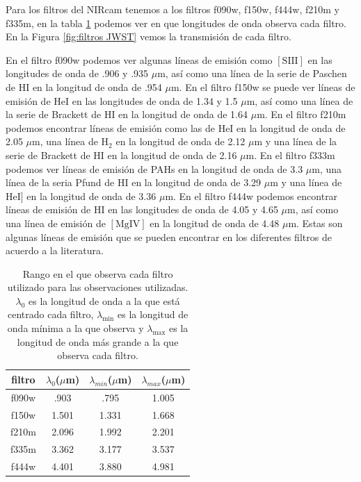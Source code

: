 \documentclass{book}
\begin{document}
Para los filtros del NIRcam  tenemos a los filtros f090w, f150w, f444w, f210m y f335m, en la tabla \ref{tab:filtros} podemos ver en que longitudes de onda observa cada filtro. En la Figura \ref{fig:filtros JWST} vemos la transmisión de cada filtro. 

En el filtro f090w podemos ver algunas líneas de emisión como $[\mathrm{S \scriptstyle{III}}]$ en las longitudes de onda de .906 y .935 $\mu$m, así como una línea de la serie de Paschen de $\mathrm{H\scriptstyle{I}}$ en la longitud de onda de .954 $\mu$m. En el filtro f150w se puede ver líneas de emisión de $\mathrm{He\scriptstyle{I}}$ en las longitudes de onda de 1.34 y 1.5 $\mu$m, así como una línea de la serie de Brackett de $\mathrm{H\scriptstyle{I}}$ en la longitud de onda de 1.64 $\mu$m. En el filtro f210m podemos encontrar líneas de emisión como las de $\mathrm{He\scriptstyle{I}}$ en la longitud de onda de 2.05 $\mu$m, una línea de $\mathrm{H_2}$ en la longitud de onda de  2.12 $\mu$m y una línea de la serie de Brackett de $\mathrm{H\scriptstyle{I}}$ en la longitud de onda de 2.16 $\mu$m. En el filtro f333m podemos ver líneas de emisión de PAHs en la longitud de onda de 3.3 $\mu$m, una línea de la seria Pfund de $\mathrm{H\scriptstyle{I}}$ en la longitud de onda de 3.29 $\mu$m y una línea de $\mathrm{He\scriptstyle{I}}]$ en la longitud de onda de 3.36 $\mu$m. En el filtro f444w podemos encontrar líneas de emisión de $\mathrm{H\scriptstyle{I}}$ en las longitudes de onda de 4.05 y 4.65 $\mu$m, así como una línea de emisión de $[\mathrm{Mg\scriptstyle{IV}}]$ en la longitud de onda de 4.48 $\mu$m. Estas son algunas líneas de emisión que se pueden encontrar en los diferentes filtros de acuerdo a la literatura. 

\begin{table}[htb]
    \centering
    \begin{tabular}{c c c c}
        \toprule
        filtro & $\lambda_0$($\mu$m) & $\lambda_{min}$($\mu$m) & $\lambda_{max}$($\mu$m) \\ 
        \midrule
         f090w & .903 & .795 & 1.005\\
         f150w &1.501 &1.331 & 1.668\\
         f210m &2.096 &1.992 & 2.201\\
         f335m &3.362 &3.177 & 3.537\\
         f444w &4.401 &3.880 & 4.981\\
         \bottomrule
    \end{tabular}
    \caption{Rango en el que observa cada filtro utilizado para las observaciones utilizadas. $\lambda_0$ es la longitud de onda a la que está centrado cada filtro, $\lambda_\mathrm{min}$ es la longitud de onda mínima a la que observa y $\lambda
    _\mathrm{max}$ es la longitud de onda más grande a la que observa cada filtro.}
    \label{tab:filtros}
\end{table}
\end{document}
